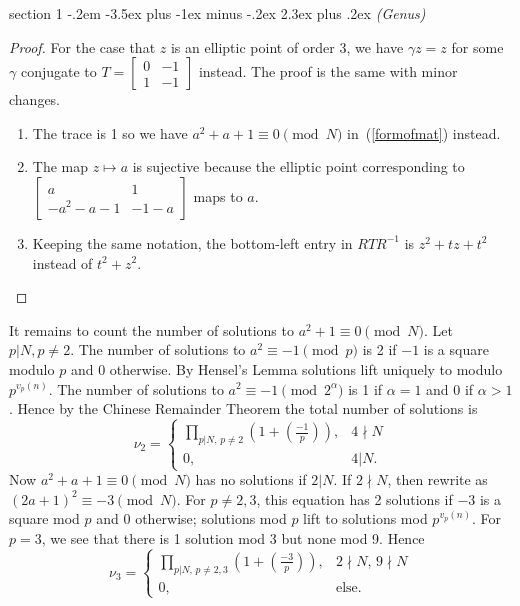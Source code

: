 \documentclass[12pt]{article}
\makeatletter
\theoremstyle{norm}
\newcommand{\al}[0]{\alpha}
\newcommand{\ga}[0]{\gamma}
\newcommand{\pa}[1]{\left( {#1} \right)}
\newcommand{\pf}[2]{\pa{\frac{#1}{#2}}}
\newcommand{\smatt}[4]{
\left[
\begin{smallmatrix}
{#1}&{#2}\\
{#3}&{#4}
\end{smallmatrix}
\right]}
\newenvironment{problem}{\@startsection
       {section}
       {1}
       {-.2em}
       {-3.5ex plus -1ex minus -.2ex}
       {2.3ex plus .2ex}
       {\pagebreak[3]%
       \large\bf\noindent{Problem }
       }
       }
       {%
       }
\makeatother
\begin{document}
\begin{problem}{\it (Genus)}
\begin{proof}
For the case that $z$ is an elliptic point of order 3, we have $\ga z=z$ for some $\ga$ conjugate to $T=\smatt0{-1}{1}{-1}$ instead. The proof is the same with minor changes.
\begin{enumerate}
\item
The trace is 1 so we have $a^2+a+1\equiv 0\pmod N$ in~(\ref{formofmat}) instead.
\item
The map $z\mapsto a$ is sujective because the elliptic point corresponding to $\smatt {a}{1}{-a^2-a-1}{-1-a}$ maps to $a$.
\item 
Keeping the same notation, 
the bottom-left entry in $RTR^{-1}$ is $z^2+tz+t^2$ instead of $t^2+z^2$.
\end{enumerate}
\end{proof}
It remains to count the number of solutions to $a^2+1\equiv 0\pmod N$. Let $p|N,p\neq 2$. The number of solutions to $a^2\equiv -1\pmod p$ is 2 if $-1$ is a square modulo $p$ and 0 otherwise. By Hensel's Lemma solutions lift uniquely to modulo $p^{v_p(n)}$. The number of solutions to $a^2\equiv -1\pmod{2^{\al}}$ is 1 if $\al=1$ and 0 if $\al>1$. Hence by the Chinese Remainder Theorem the total number of solutions is
\begin{equation}\label{ell2}
\nu_2=\begin{cases}
\prod_{p|N,\,p\neq 2}\pa{1+\pf{-1}{p}},&4\nmid N\\
0,&4| N.
\end{cases}
\end{equation}
Now $a^2+a+1\equiv 0\pmod N$ has no solutions if $2|N$. If $2\nmid N$, then rewrite as $(2a+1)^2\equiv -3\pmod N$. For $p\neq 2,3$, this equation has 2 solutions if $-3$ is a square mod $p$ and 0 otherwise; solutions mod $p$ lift to solutions mod $p^{v_p(n)}$. For $p=3$, we see that there is 1 solution mod 3 but none mod 9. Hence
\begin{equation}\label{ell3}
\nu_3=\begin{cases}
\prod_{p|N,\,p\neq 2,3}\pa{1+\pf{-3}{p}},&2\nmid N,\,9\nmid N\\
0,&\text{else}.
\end{cases}
\end{equation}


\end{problem}
\end{document}
